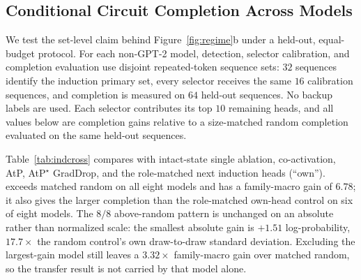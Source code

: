 \subsection{Conditional Circuit Completion Across Models}
\label{app:gen-group}

We test the set-level claim behind Figure~\ref{fig:regime}b under a held-out, equal-budget protocol. For each non-GPT-2 model, detection, selector calibration, and completion evaluation use disjoint repeated-token sequence sets: $32$ sequences identify the induction primary set, every selector receives the same $16$ calibration sequences, and completion is measured on $64$ held-out sequences. No backup labels are used. Each selector contributes its top $10$ remaining heads, and all values below are completion gains %
relative to a size-matched random completion evaluated on the same held-out sequences.

Table~\ref{tab:indcross} compares \coax with intact-state single ablation, co-activation, AtP, AtP$^\star$ GradDrop, and the role-matched next induction heads (``own''). \coax exceeds matched random on all eight models and has a family-macro gain of $6.78$; it also gives the larger completion than the role-matched own-head control on six of eight models. The $8/8$ above-random pattern is unchanged on an absolute rather than normalized scale: the smallest absolute gain is $+1.51$ log-probability, $17.7\times$ the random control's own draw-to-draw standard deviation. Excluding the largest-gain model still leaves a $3.32\times$ family-macro gain over matched random, so the transfer result is not carried by that model alone.

